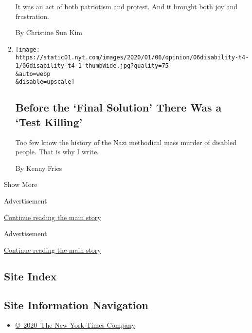 \begin{enumerate}
  It was an act of both patriotism and protest. And it brought both joy
  and frustration.

  By Christine Sun Kim
\item
  \href{/2020/01/08/opinion/disability-nazi-eugenics.html}{}

  \texttt{[image: https://static01.nyt.com/images/2020/01/06/opinion/06disability-t4-1/06disability-t4-1-thumbWide.jpg?quality=75\\\&auto=webp\\\&disable=upscale]}

  \hypertarget{before-the-final-solution-there-was-a-test-killing}{%
  \subsection{Before the `Final Solution' There Was a `Test
  Killing'}\label{before-the-final-solution-there-was-a-test-killing}}

  Too few know the history of the Nazi methodical mass murder of
  disabled people. That is why I write.

  By Kenny Fries
\end{enumerate}

Show More

Advertisement

\protect\hyperlink{after-mid1}{Continue reading the main story}

Advertisement

\protect\hyperlink{after-mktg}{Continue reading the main story}

\hypertarget{site-index}{%
\subsection{Site Index}\label{site-index}}

\hypertarget{site-information-navigation}{%
\subsection{Site Information
Navigation}\label{site-information-navigation}}

\begin{itemize}
\tightlist
\item
  \href{https://help.nytimes.com/hc/en-us/articles/115014792127-Copyright-notice}{©~2020~The
  New York Times Company}
\end{itemize}

